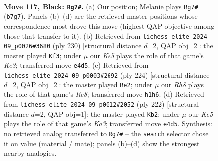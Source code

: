 \documentclass[11pt]{article}
\begin{document}
\clearpage

\begin{figure}[p]\centering
\begin{subfigure}{0.46\textwidth}\centering
\resizebox{\linewidth}{!}{%
\newchessgame
\chessboard[
  setfen={8/1r6/8/8/4k1K1/8/8/7r b - - 9 117},
  showmover=false,
  pgfstyle=straightmove, color=movearrow, markmove={b7-g7}
]}
\caption{}
\end{subfigure}\hfill
\begin{subfigure}{0.46\textwidth}\centering
\resizebox{\linewidth}{!}{%
\newchessgame
\chessboard[
  setfen={8/8/8/3R4/8/2k1K3/8/r7 w - - 83 116},
  showmover=false,
  pgfstyle=straightmove, color=movearrow, markmove={e3-f3}
]}
\caption{}
\end{subfigure}
\\[4pt]
\begin{subfigure}{0.46\textwidth}\centering
\resizebox{\linewidth}{!}{%
\newchessgame
\chessboard[
  setfen={4R3/2r5/5k2/8/5K2/8/8/8 w - - 21 113},
  showmover=false,
  pgfstyle=straightmove, color=movearrow, markmove={e8-e2}
]}
\caption{}
\end{subfigure}\hfill
\begin{subfigure}{0.46\textwidth}\centering
\resizebox{\linewidth}{!}{%
\newchessgame
\chessboard[
  setfen={8/5r2/8/1k6/7R/K7/8/8 w - - 0 112},
  showmover=false,
  pgfstyle=straightmove, color=movearrow, markmove={a3-b2}
]}
\caption{}
\end{subfigure}
\caption{\textbf{Move 117, Black: \texttt{Rg7\#}.} (a) Our position; Melanie plays \texttt{Rg7\#} (\texttt{b7g7}). Panels (b)--(d) are the retrieved master positions whose correspondence most drove this move (highest QAP objective among those that transfer to it). (b) Retrieved from \texttt{lichess\_elite\_2024-09\_p0026\#3680} (ply 230) [structural distance $d$=2, QAP obj=2]: the master played \texttt{Kf3}; under $\mu$ our \emph{Ke5} plays the role of that game's \emph{Ke3}; transferred move \texttt{e4d5}. (c) Retrieved from \texttt{lichess\_elite\_2024-09\_p0003\#2692} (ply 224) [structural distance $d$=2, QAP obj=2]: the master played \texttt{Re2}; under $\mu$ our \emph{Rh8} plays the role of that game's \emph{Re8}; transferred move \texttt{h1h6}. (d) Retrieved from \texttt{lichess\_elite\_2024-09\_p0012\#2052} (ply 222) [structural distance $d$=2, QAP obj=1]: the master played \texttt{Kb2}; under $\mu$ our \emph{Ke5} plays the role of that game's \emph{Ka3}; transferred move \texttt{e4d5}. Synthesis: no retrieved analog transferred to \texttt{Rg7\#} -- the \texttt{search} selector chose it on value (material / mate); panels (b)--(d) show the strongest nearby analogies.}
\label{fig:thought-m233}
\end{figure}
\end{document}
